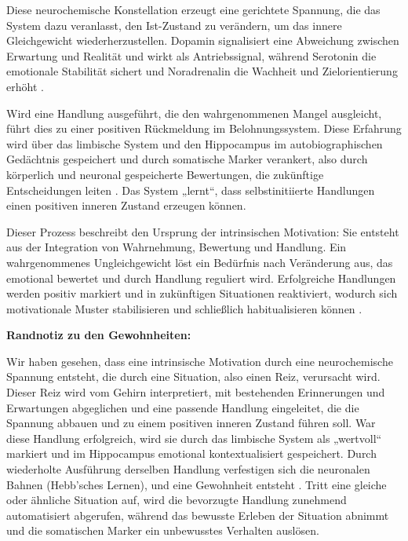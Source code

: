 Diese neurochemische Konstellation erzeugt eine gerichtete Spannung, die das System dazu veranlasst, den Ist-Zustand zu verändern, um das innere Gleichgewicht wiederherzustellen. Dopamin signalisiert eine Abweichung zwischen Erwartung und Realität und wirkt als Antriebssignal, während Serotonin die emotionale Stabilität sichert und Noradrenalin die Wachheit und Zielorientierung erhöht \cite{Schultz1997, AstonJones2005, Cools2008}.

Wird eine Handlung ausgeführt, die den wahrgenommenen Mangel ausgleicht, führt dies zu einer positiven Rückmeldung im Belohnungssystem. Diese Erfahrung wird über das limbische System und den Hippocampus im autobiographischen Gedächtnis gespeichert und durch somatische Marker verankert, also durch körperlich und neuronal gespeicherte Bewertungen, die zukünftige Entscheidungen leiten \cite{Damasio1994, Damasio1999}. Das System „lernt“, dass selbstinitiierte Handlungen einen positiven inneren Zustand erzeugen können.

Dieser Prozess beschreibt den Ursprung der intrinsischen Motivation: Sie entsteht aus der Integration von Wahrnehmung, Bewertung und Handlung. Ein wahrgenommenes Ungleichgewicht löst ein Bedürfnis nach Veränderung aus, das emotional bewertet und durch Handlung reguliert wird. Erfolgreiche Handlungen werden positiv markiert und in zukünftigen Situationen reaktiviert, wodurch sich motivationale Muster stabilisieren und schließlich habitualisieren können \cite{Hebb1949, Graybiel2008, YinKnowlton2006}.


\textbf{Randnotiz zu den Gewohnheiten:}

Wir haben gesehen, dass eine intrinsische Motivation durch eine neurochemische Spannung entsteht, die durch eine Situation, also einen Reiz, verursacht wird. Dieser Reiz wird vom Gehirn interpretiert, mit bestehenden Erinnerungen und Erwartungen abgeglichen und eine passende Handlung eingeleitet, die die Spannung abbauen und zu einem positiven inneren Zustand führen soll.
War diese Handlung erfolgreich, wird sie durch das limbische System als „wertvoll“ markiert und im Hippocampus emotional kontextualisiert gespeichert. Durch wiederholte Ausführung derselben Handlung verfestigen sich die neuronalen Bahnen (Hebb’sches Lernen), und eine Gewohnheit entsteht \cite{Hebb1949, Graybiel2008, YinKnowlton2006}.
Tritt eine gleiche oder ähnliche Situation auf, wird die bevorzugte Handlung zunehmend automatisiert abgerufen, während das bewusste Erleben der Situation abnimmt und die somatischen Marker ein unbewusstes Verhalten auslösen.

